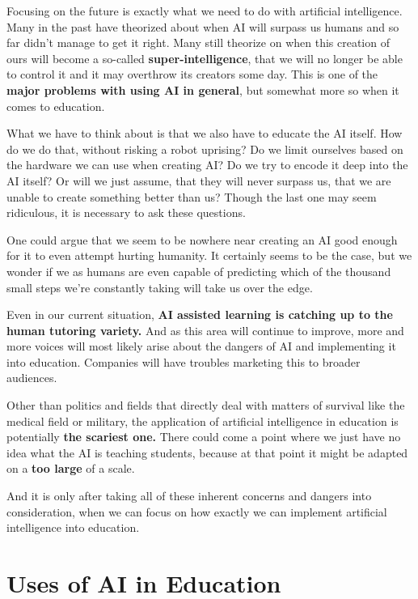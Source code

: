\documentclass[10pt,a4paper,]{article}
\begin{document}
Focusing on the future is exactly what we need to do with artificial intelligence. Many in the past have theorized about when AI will surpass us humans and so far didn't manage to get it right. Many still theorize on when this creation of ours will become a so-called \textbf{super-intelligence}, that we will no longer be able to control it and it may overthrow its creators some day. This is one of the \textbf{major problems with using AI in general}, but somewhat more so when it comes to education.

What we have to think about is that we also have to educate the AI itself. How do we do that, without risking a robot uprising? Do we limit ourselves based on the hardware we can use when creating AI? Do we try to encode it deep into the AI itself? Or will we just assume, that they will never surpass us, that we are unable to create something better than us? Though the last one may seem ridiculous, it is necessary to ask these questions.

One could argue that we seem to be nowhere near creating an AI good enough for it to even attempt hurting humanity. It certainly seems to be the case, but we wonder if we as humans are even capable of predicting which of the thousand small steps we're constantly taking will take us over the edge.

Even in our current situation, \textbf{AI assisted learning is catching up to the human tutoring variety.}\cite{VanLehn2011} And as this area will continue to improve, more and more voices will most likely arise about the dangers of AI and implementing it into education. Companies will have troubles marketing this to broader audiences.\cite{KRAFFT2020}

Other than politics and fields that directly deal with matters of survival like the medical field or military, the application of artificial intelligence in education is potentially \textbf{the scariest one.} There could come a point where we just have no idea what the AI is teaching students, because at that point it might be adapted on a \textbf{too large} of a scale.

And it is only after taking all of these inherent concerns and dangers into consideration, when we can focus on how exactly we can implement artificial intelligence into education.

\section{Uses of AI in Education} \label{uses}
\end{document}
